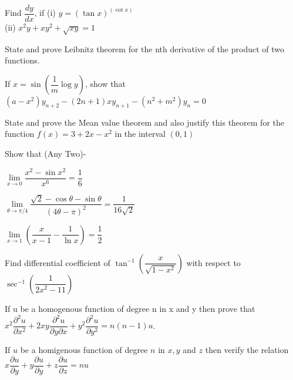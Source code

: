 \documentclass[12pt]{article}
\begin{document}
\begin{itemize}
{\begin{itemize}
      {\large
      \item[a)] Find $\dfrac{dy}{dx}$, if (i) $y=(\tan x)^{(\cot x)}$\\(ii) $x^2y+xy^2+\sqrt{xy}=1$
      \item[b)] State and prove Leibnitz theorem for the nth derivative of the product of two functions.
      \item[c)] If $x=\sin \left(\dfrac{1}{m}\log y\right)$, show that\\
      $(a-x^2)y_{n+2}-(2n+1)xy_{n+1}-(n^2+m^2)y_n=0$}
    \end{itemize}
    \item[Q4.] \begin{itemize}
      {\large
      \item[a)] State and prove the Mean value theorem and also justify this theorem for the function $f(x)=3+2x-x^2$ in the interval $(0,1)$
      \item[b)] Show that (Any Two)-\\
        \begin{itemize}
        {\large
        \item[i)] $\lim \limits_{x \to 0} \dfrac{x^2-\sin x^2}{x^6}=\dfrac{1}{6}$
        \item[ii)] $\lim \limits_{\theta \to \pi/4} \dfrac{\sqrt{2}-\cos \theta - \sin \theta}{(4\theta - \pi)^2}=\dfrac{1}{16\sqrt{2}}$
        \item[iii)] $\lim \limits_{x \to 1} \left(\dfrac{x}{x-1}-\dfrac{1}{\ln x}\right)=\dfrac{1}{2}$}
        \end{itemize}
      \item[c)] Find differential coefficient of $\tan^{-1} \left( \dfrac{x}{\sqrt{1-x^2}}\right)$ with respect to\\ $\sec^{-1} \left(\dfrac{1}{2x^2-11}\right)$}
    \end{itemize}
    \item[Q5.] \begin{itemize}
      {\large
      \item[a)] If u be a homogenous function of degree n in x and y then prove that\\
      $x^2\dfrac{\partial^2u}{\partial x^2}+2xy\dfrac{\partial^2u}{\partial y\partial x}+y^2\dfrac{\partial^2u}{\partial y^2}=n(n-1)u$.
      \item[b)] If $u$ be a homigenous function of degree $n$ in $x, y$ and $z$ then verify the relation\\
      $x\dfrac{\partial u}{\partial y}+y\dfrac{\partial u}{\partial y}+z\dfrac{\partial u}{\partial z}=nu$
}
\end{itemize}}
\end{itemize}
\end{document}

